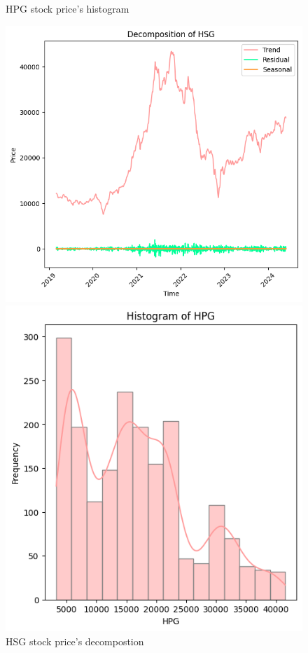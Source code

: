 \documentclass{ieeeojies}
\begin{document}
\begin{figure}[H]
\begin{minipage}{0.23\textwidth}
    \caption{HPG stock price's histogram}
    \label{fig:2}
    \end{minipage}
\end{figure}

\begin{figure}[H]
    \centering
    \begin{minipage}{0.23\textwidth}
    \centering
    \includegraphics[width=1\textwidth]{bibliography/Figure/Decomposition_HSG.png}
    \caption{HSG stock price's decompostion}
    \label{fig:1}
    \end{minipage}
    \hfill
    \begin{minipage}{0.23\textwidth}
    \centering
    \includegraphics[width=1\textwidth]{bibliography/Figure/Histogram_HSG.png}

\end{minipage}
\end{figure}
\end{document}
